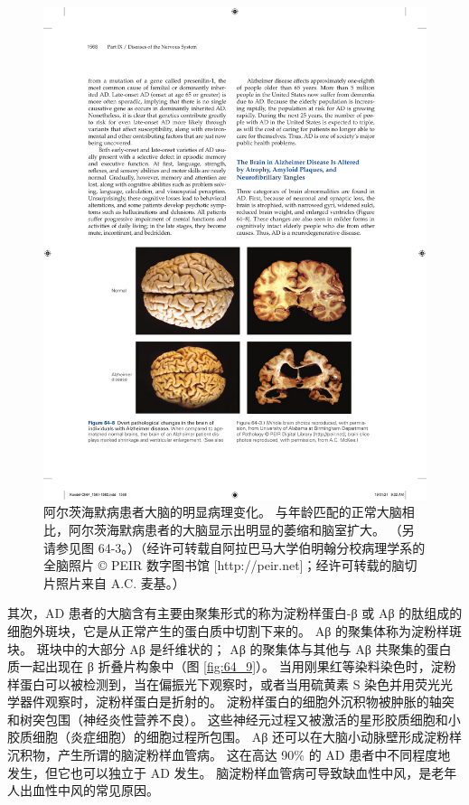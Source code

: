 \begin{figure}[htbp]
	\centering
	\includegraphics[width=0.8\linewidth]{chap64/fig_64_8}
	\caption{阿尔茨海默病患者大脑的明显病理变化。 与年龄匹配的正常大脑相比，阿尔茨海默病患者的大脑显示出明显的萎缩和脑室扩大。 （另请参见图 64-3。）（经许可转载自阿拉巴马大学伯明翰分校病理学系的全脑照片 © PEIR 数字图书馆 [http://peir.net]；经许可转载的脑切片照片来自 A.C. 麦基。）}
	\label{fig:64_8}
\end{figure}


其次，AD 患者的大脑含有主要由聚集形式的称为淀粉样蛋白-β 或 Aβ 的肽组成的细胞外斑块，它是从正常产生的蛋白质中切割下来的。
Aβ 的聚集体称为淀粉样斑块。 斑块中的大部分 Aβ 是纤维状的；
Aβ 的聚集体与其他与 Aβ 共聚集的蛋白质一起出现在 β 折叠片构象中（图 \ref{fig:64_9}）。
当用刚果红等染料染色时，淀粉样蛋白可以被检测到，当在偏振光下观察时，或者当用硫黄素 S 染色并用荧光光学器件观察时，淀粉样蛋白是折射的。
淀粉样蛋白的细胞外沉积物被肿胀的轴突和树突包围（神经炎性营养不良）。
这些神经元过程又被激活的星形胶质细胞和小胶质细胞（炎症细胞）的细胞过程所包围。
Aβ 还可以在大脑小动脉壁形成淀粉样沉积物，产生所谓的脑淀粉样血管病。
这在高达 90\% 的 AD 患者中不同程度地发生，但它也可以独立于 AD 发生。
脑淀粉样血管病可导致缺血性中风，是老年人出血性中风的常见原因。


